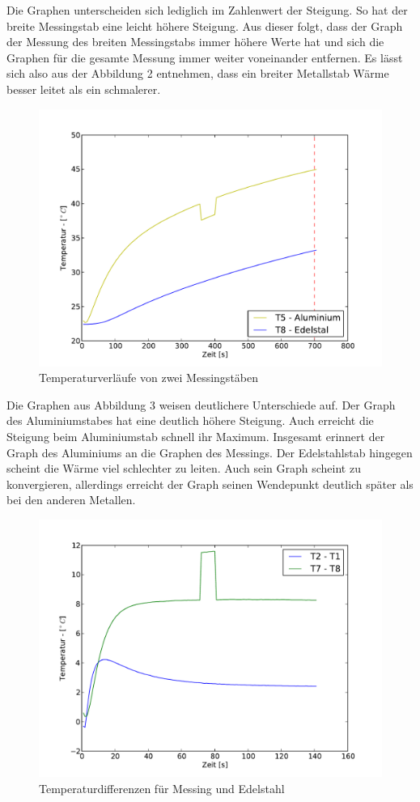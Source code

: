 \documentclass[11pt]{article}
\begin{document}
Die Graphen unterscheiden sich lediglich im Zahlenwert der Steigung. So hat der breite Messingstab eine leicht höhere Steigung. Aus dieser folgt, dass der Graph der Messung des breiten Messingstabs immer höhere Werte hat und sich die Graphen für die gesamte Messung immer weiter voneinander entfernen.
Es lässt sich also aus der Abbildung 2 entnehmen, dass ein breiter Metallstab Wärme besser leitet als ein schmalerer.
\begin{figure}[H]
\centering
\includegraphics[width = \textwidth]{Diagramme/Abb2.pdf}
\caption{Temperaturverläufe von zwei Messingstäben}
\label{T5T8}
\end{figure} \noindent
Die Graphen aus Abbildung 3 weisen deutlichere Unterschiede auf. Der Graph des Aluminiumstabes hat eine deutlich höhere Steigung. Auch erreicht die Steigung beim Aluminiumstab schnell ihr Maximum. Insgesamt erinnert der Graph des Aluminiums an die Graphen des Messings. Der Edelstahlstab hingegen scheint die Wärme viel schlechter zu leiten. Auch sein Graph scheint zu konvergieren, allerdings erreicht der Graph seinen Wendepunkt deutlich später als bei den anderen Metallen.
\begin{figure}[H]
\centering
\includegraphics[width = \textwidth]{Diagramme/Abb3.pdf}
\caption{Temperaturdifferenzen für Messing und Edelstahl}
\label{diff}
\end{figure}\noindent
\end{document}
